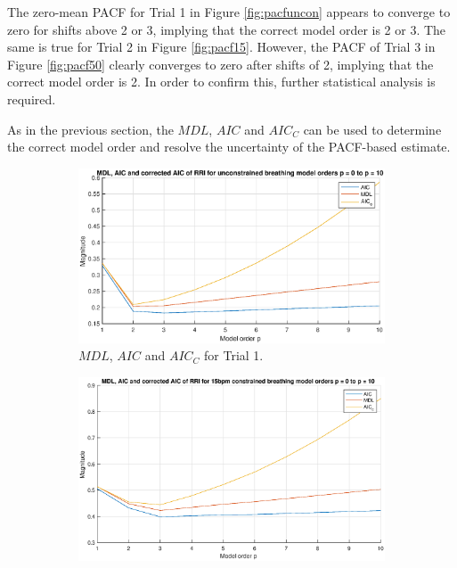 \noindent
The zero-mean PACF for Trial 1 in Figure \ref{fig:pacfuncon} appears to converge to zero for shifts above 2 or 3, implying that the correct model order is 2 or 3. The same is true for Trial 2 in Figure \ref{fig:pacf15}. However, the PACF of Trial 3 in Figure \ref{fig:pacf50} clearly converges to zero after shifts of 2, implying that the correct model order is 2. In order to confirm this, further statistical analysis is required.

\vspace{0.5cm}
\noindent
As in the previous section, the $MDL$, $AIC$ and $AIC_{C}$ can be used to determine the correct model order and resolve the uncertainty of the PACF-based estimate.

\begin{figure}[H]
    \begin{center}
\begin{subfigure}{0.31\textwidth}
  \includegraphics[width=\linewidth]{assignment2figs/mdl_aic_uncon.eps}
  \caption{$MDL$, $AIC$ and $AIC_{C}$ for Trial 1.}
\label{fig:1}
\end{subfigure}
\begin{subfigure}{0.31\textwidth}
  \includegraphics[width=\linewidth]{assignment2figs/mdl_aic_15.eps}

\end{subfigure}
\end{center}
\end{figure}
